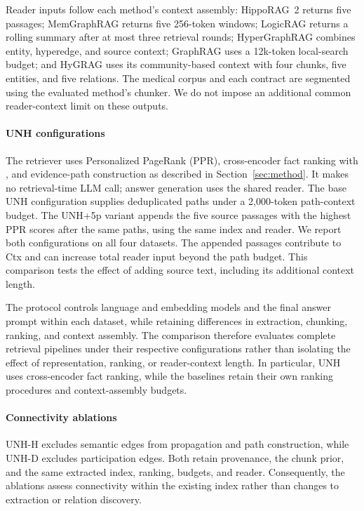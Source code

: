 \documentclass[sigconf, review, anonymous]{acmart}
\newcommand{\sys}{UNH}
\begin{document}
Reader inputs follow each method's context assembly: HippoRAG~2 returns five passages; MemGraphRAG returns five 256-token windows; LogicRAG returns a rolling summary after at most three retrieval rounds; HyperGraphRAG combines entity, hyperedge, and source context; GraphRAG uses a 12k-token local-search budget; and HyGRAG uses its community-based context with four chunks, five entities, and five relations. The medical corpus and each contract are segmented using the evaluated method's chunker. We do not impose an additional common reader-context limit on these outputs.

\paragraph{\sys{} configurations}
The retriever uses Personalized PageRank (PPR), cross-encoder fact ranking with , and evidence-path construction as described in Section~\ref{sec:method}. It makes no retrieval-time LLM call; answer generation uses the shared reader. The base \sys{} configuration supplies deduplicated paths under a 2,000-token path-context budget. The \sys{}+5p variant appends the five source passages with the highest PPR scores after the same paths, using the same index and reader. We report both configurations on all four datasets. The appended passages contribute to Ctx and can increase total reader input beyond the path budget. This comparison tests the effect of adding source text, including its additional context length.

The protocol controls language and embedding models and the final answer prompt within each dataset, while retaining differences in extraction, chunking, ranking, and context assembly. The comparison therefore evaluates complete retrieval pipelines under their respective configurations rather than isolating the effect of representation, ranking, or reader-context length. In particular, \sys{} uses cross-encoder fact ranking, while the baselines retain their own ranking procedures and context-assembly budgets.

\paragraph{Connectivity ablations}
\label{sec:metrics}
UNH-H excludes semantic edges from propagation and path construction, while UNH-D excludes participation edges. Both retain provenance, the chunk prior, and the same extracted index, ranking, budgets, and reader. Consequently, the ablations assess connectivity within the existing index rather than changes to extraction or relation discovery.
\end{document}
